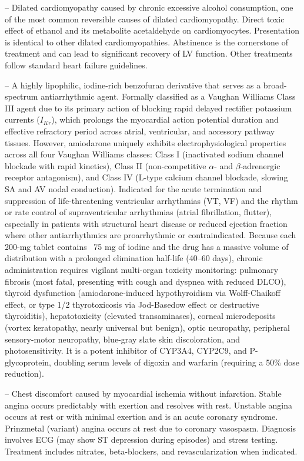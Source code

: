 -- Dilated cardiomyopathy caused by chronic excessive alcohol consumption, one of the most common reversible causes of dilated cardiomyopathy. Direct toxic effect of ethanol and its metabolite acetaldehyde on cardiomyocytes. Presentation is identical to other dilated cardiomyopathies. Abstinence is the cornerstone of treatment and can lead to significant recovery of LV function. Other treatments follow standard heart failure guidelines.

-- A highly lipophilic, iodine-rich benzofuran derivative that serves as a broad-spectrum antiarrhythmic agent. Formally classified as a Vaughan Williams Class III agent due to its primary action of blocking rapid delayed rectifier potassium currents ($I_{Kr}$), which prolongs the myocardial action potential duration and effective refractory period across atrial, ventricular, and accessory pathway tissues. However, amiodarone uniquely exhibits electrophysiological properties across all four Vaughan Williams classes: Class I (inactivated sodium channel blockade with rapid kinetics), Class II (non-competitive $\alpha$- and $\beta$-adrenergic receptor antagonism), and Class IV (L-type calcium channel blockade, slowing SA and AV nodal conduction). Indicated for the acute termination and suppression of life-threatening ventricular arrhythmias (VT, VF) and the rhythm or rate control of supraventricular arrhythmias (atrial fibrillation, flutter), especially in patients with structural heart disease or reduced ejection fraction where other antiarrhythmics are proarrhythmic or contraindicated. Because each 200-mg tablet contains ~75 mg of iodine and the drug has a massive volume of distribution with a prolonged elimination half-life (40--60 days), chronic administration requires vigilant multi-organ toxicity monitoring: pulmonary fibrosis (most fatal, presenting with cough and dyspnea with reduced DLCO), thyroid dysfunction (amiodarone-induced hypothyroidism via Wolff-Chaikoff effect, or type 1/2 thyrotoxicosis via Jod-Basedow effect or destructive thyroiditis), hepatotoxicity (elevated transaminases), corneal microdeposits (vortex keratopathy, nearly universal but benign), optic neuropathy, peripheral sensory-motor neuropathy, blue-gray slate skin discoloration, and photosensitivity. It is a potent inhibitor of CYP3A4, CYP2C9, and P-glycoprotein, doubling serum levels of digoxin and warfarin (requiring a 50\% dose reduction).

-- Chest discomfort caused by myocardial ischemia without infarction. Stable angina occurs predictably with exertion and resolves with rest. Unstable angina occurs at rest or with minimal exertion and is an acute coronary syndrome. Prinzmetal (variant) angina occurs at rest due to coronary vasospasm. Diagnosis involves ECG (may show ST depression during episodes) and stress testing. Treatment includes nitrates, beta-blockers, and revascularization when indicated.

